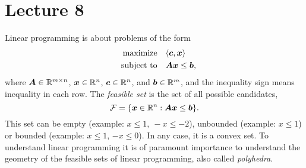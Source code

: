 %
%
% 


\chapter*{Lecture 8}
\addtocounter{chapter}{8}
\addtocounter{section}{0}


Linear programming is about problems of the form
\begin{align*}
 \text{maximize}\quad & \langle {\bm{c}}, {\bm{x}} \rangle\\
 \quad\text{subject to}\quad & \bm{A}\bm{x}\leq \bm{b},
\end{align*}
where $\bm{A}\in \mathbb{R}^{m\times n}$, $\bm{x}\in \mathbb{R}^n$, $\bm{c}\in \mathbb{R}^n$, and $\bm{b}\in \mathbb{R}^m$, and the inequality sign means inequality in each row. The {\em feasible set} is the set of all possible candidates, 
\begin{equation*}
 \mathcal{F} = \{\bm{x}\in \mathbb{R}^n \mathrel{\mathop{:}} \bm{A}\bm{x}\leq \bm{b}\}.
\end{equation*}
This set can be empty (example: $x\leq 1, \ -x\leq -2$), unbounded (example: $x\leq 1$) or bounded (example: $x\leq 1$, $-x\leq 0$). In any case, it is a convex set. To understand linear programming it is of paramount importance to understand the geometry of the feasible sets of linear programming, also called {\em polyhedra}.


